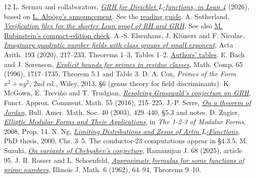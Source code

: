 \documentclass[11pt]{article}
\newcommand{\up}{https://github.com/lsernau/grh-lean/blob/72fead102f663d5c7a407964a13dc0cf9d977207/grh}
\newcommand{\gh}[2]{\href{\up/#1}{#2}}
\begin{document}
\newpage
\begin{thebibliography}{12}\normalsize\setlength{\itemsep}{0pt}\setlength{\parskip}{0pt}
 L. Sernau and collaborators, \href{https://github.com/lsernau/grh-lean}{\emph{GRH for Dirichlet $L$-functions, in Lean 4}} (2026), based on \href{https://alpo.ge/remark.pdf}{L. Alp\"oge's announcement}. See the \gh{GUIDE.md}{reading guide}.
 A. Sutherland, \href{https://math.mit.edu/~drew/shortgrh/}{\emph{Verification files for the shorter Lean proof of RH and GRH}}. See also \href{https://mrubinst.github.io/grh-lean-compact-check/}{M. Rubinstein's compact-edition check}.
 A.-S. Elsenhans, J. Kl\"uners and F. Nicolae, \href{https://arxiv.org/abs/1803.02056}{\emph{Imaginary quadratic number fields with class groups of small exponent}}, Acta Arith. 193 (2020), 217--233, Theorems 1--3, Tables 1--2. \href{https://math.uni-paderborn.de/en/ag/ca/research/exponent/exponent0}{Authors' tables}.
 E. Bach and J. Sorenson, \href{https://doi.org/10.1090/S0025-5718-96-00763-6}{\emph{Explicit bounds for primes in residue classes}}, Math. Comp. 65 (1996), 1717--1735, Theorem 5.1 and Table 3.
 D. A. Cox, \emph{Primes of the Form $x^2+ny^2$}, 2nd ed., Wiley, 2013, \S6 (genus theory for field discriminants).
 K. McGown, E. Trevi\~no and T. Trudgian, \href{https://arxiv.org/abs/1508.05182}{\emph{Resolving Grosswald's conjecture on GRH}}, Funct. Approx. Comment. Math. 55 (2016), 215--225.
 J.-P. Serre, \href{https://www.math.mcgill.ca/goren/SeminarOnCohomology/Serre.pdf}{\emph{On a theorem of Jordan}}, Bull. Amer. Math. Soc. 40 (2003), 429--440, \S5.3 and notes.
 D. Zagier, \href{https://www.its.caltech.edu/~matilde/Zagier123ModularForms.pdf}{\emph{Elliptic Modular Forms and Their Applications}}, in \emph{The 1-2-3 of Modular Forms}, 2008, Prop. 14.
 N. Ng, \href{https://www.cs.uleth.ca/~nathanng/RESEARCH/phd.thesis.pdf}{\emph{Limiting Distributions and Zeros of Artin $L$-Functions}}, PhD thesis, 2000, Chs. 3--5. The conductor-23 computations appear in \S4.3.5.
 M. Suzuki, \href{https://arxiv.org/abs/2411.07436}{\emph{On variants of Chebyshev's conjecture}}, Ramanujan J. 68 (2025), article 95.
 J. B. Rosser and L. Schoenfeld, \href{https://doi.org/10.1215/ijm/1255631807}{\emph{Approximate formulas for some functions of prime numbers}}, Illinois J. Math. 6 (1962), 64--94, Theorems 9--10.
\end{thebibliography}
\end{document}
